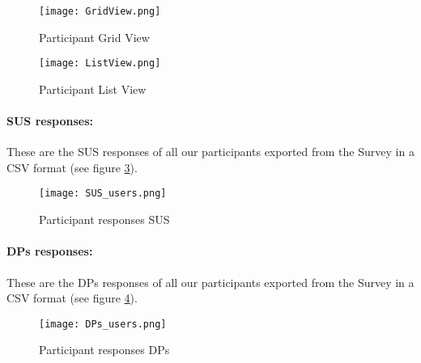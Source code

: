 \begin{figure}[ht]
    \centering
    \texttt{[image: GridView.png]}
    \caption[Example prototype]{Participant Grid View}
    \label{appendix:fig:gridview}
\end{figure}

\begin{figure}[ht]
    \centering
    \texttt{[image: ListView.png]}
    \caption[Example prototype]{Participant List View}
    \label{appendix:fig:listview}
\end{figure}

\paragraph{SUS responses:}
These are the SUS responses of all our participants exported from the Survey in a CSV format (see figure \ref{appendix:fig:sus_responses}).
\begin{figure}[ht]
    \centering
    \texttt{[image: SUS\_users.png]}
    \caption[SUS responses]{Participant responses SUS}
    \label{appendix:fig:sus_responses}
\end{figure}
\paragraph{DPs responses:}
These are the DPs responses of all our participants exported from the Survey in a CSV format (see figure \ref{appendix:fig:dps_responses}).
\begin{figure}[ht]
    \centering
    \texttt{[image: DPs\_users.png]}
    \caption[DPs responses]{Participant responses DPs}
    \label{appendix:fig:dps_responses}
\end{figure}